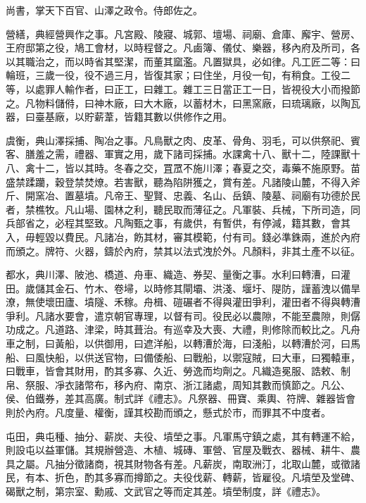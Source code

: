 尚書，掌天下百官、山澤之政令。侍郎佐之。

營繕，典經營興作之事。凡宮殿、陵寢、城郭、壇場、祠廟、倉庫、廨宇、營房、王府邸第之役，鳩工會材，以時程督之。凡鹵簿、儀仗、樂器，移內府及所司，各以其職治之，而以時省其堅潔，而董其窳濫。凡置獄具，必如律。凡工匠二等：曰輪班，三歲一役，役不過三月，皆復其家；曰住坐，月役一旬，有稍食。工役二等，以處罪人輸作者，曰正工，曰雜工。雜工三日當正工一日，皆視役大小而撥節之。凡物料儲偫，曰神木廠，曰大木廠，以蓄材木，曰黑窯廠，曰琉璃廠，以陶瓦器，曰臺基廠，以貯薪葦，皆籍其數以供修作之用。

虞衡，典山澤採捕、陶冶之事。凡鳥獸之肉、皮革、骨角、羽毛，可以供祭祀、賓客、膳羞之需，禮器、軍實之用，歲下諸司採捕。水課禽十八、獸十二，陸課獸十八、禽十二，皆以其時。冬春之交，罝罛不施川澤；春夏之交，毒藥不施原野。苗盛禁蹂躪，穀登禁焚燎。若害獸，聽為陷阱獲之，賞有差。凡諸陵山麓，不得入斧斤、開窯冶、置墓墳。凡帝王、聖賢、忠義、名山、岳鎮、陵墓、祠廟有功德於民者，禁樵牧。凡山場、園林之利，聽民取而薄征之。凡軍裝、兵械，下所司造，同兵部省之，必程其堅致。凡陶甄之事，有歲供，有暫供，有停減，籍其數，會其入，毋輕毀以費民。凡諸冶，飭其材，審其模範，付有司。錢必準銖兩，進於內府而頒之。牌符、火器，鑄於內府，禁其以法式洩於外。凡顏料，非其土產不以征。

都水，典川澤、陂池、橋道、舟車、織造、券契、量衡之事。水利曰轉漕，曰灌田。歲儲其金石、竹木、卷埽，以時修其閘壩、洪淺、堰圩、隄防，謹蓄洩以備旱潦，無使壞田廬、墳隧、禾稼。舟楫、磑碾者不得與灌田爭利，灌田者不得與轉漕爭利。凡諸水要會，遣京朝官專理，以督有司。役民必以農隙，不能至農隙，則僝功成之。凡道路、津梁，時其葺治。有巡幸及大喪、大禮，則修除而較比之。凡舟車之制，曰黃船，以供御用，曰遮洋船，以轉漕於海，曰淺船，以轉漕於河，曰馬船、曰風快船，以供送官物，曰備倭船、曰戰船，以禦寇賊，曰大車，曰獨轅車，曰戰車，皆會其財用，酌其多寡、久近、勞逸而均劑之。凡織造冕服、誥敕、制帛、祭服、凈衣諸幣布，移內府、南京、浙江諸處，周知其數而慎節之。凡公、侯、伯鐵券，差其高廣。制式詳《禮志》。凡祭器、冊寶、乘輿、符牌、雜器皆會則於內府。凡度量、權衡，謹其校勘而頒之，懸式於市，而罪其不中度者。

屯田，典屯種、抽分、薪炭、夫役、墳塋之事。凡軍馬守鎮之處，其有轉運不給，則設屯以益軍儲。其規辦營造、木植、城磚、軍營、官屋及戰衣、器械、耕牛、農具之屬。凡抽分徵諸商，視其財物各有差。凡薪炭，南取洲汀，北取山麓，或徵諸民，有本、折色，酌其多寡而撙節之。夫役伐薪、轉薪，皆雇役。凡墳塋及堂碑、碣獸之制，第宗室、勳戚、文武官之等而定其差。墳塋制度，詳《禮志》。


